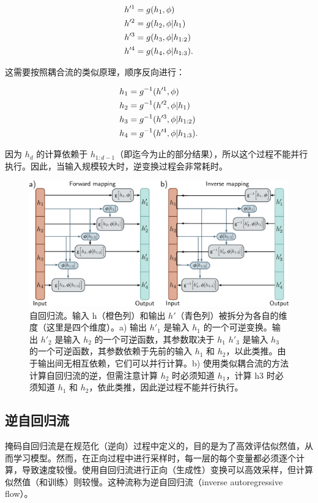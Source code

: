 \begin{align}
&h'^1 = g(h_1, \phi) \notag \\
&h'^2 = g(h_2, \phi|h_1) \notag \\
&h'^3 = g(h_3, \phi|h_{1:2}) \notag \\
&h'^4 = g(h_4, \phi|h_{1:3}) .  
\end{align}


这需要按照耦合流的类似原理，顺序反向进行：


\begin{align}
&h_1 = g^{-1}(h'^1, \phi) \notag \\
&h_2 = g^{-1}(h'^2, \phi|h_1) \notag \\
&h_3 = g^{-1}(h'^3, \phi|h_{1:2}) \notag \\
&h_4 = g^{-1}(h'^4, \phi|h_{1:3}) . 
\end{align} 


因为 \(h_d\) 的计算依赖于 \(h_{1:d-1}\)（即迄今为止的部分结果），所以这个过程不能并行执行。因此，当输入规模较大时，逆变换过程会非常耗时。

\begin{figure}[ht!]
\centering
\includegraphics[width=0.7\linewidth]{png/chapter16/FlowAutoregressive.png}
\caption{自回归流。输入 h（橙色列）和输出 \(h \prime\)（青色列）被拆分为各自的维度（这里是四个维度）。a) 输出 \(h \prime _1\) 是输入 \(h_1\) 的一个可逆变换。输出 \(h \prime_2\) 是输入 \(h_2\) 的一个可逆函数，其参数取决于 \(h_1\) \(h\prime_3\) 是输入 \(h_3\) 的一个可逆函数，其参数依赖于先前的输入 \(h_1\) 和 \(h_2\)，以此类推。由于输出间无相互依赖，它们可以并行计算。b) 使用类似耦合流的方法计算自回归流的逆，但需注意计算 \(h_2\) 时必须知道 \(h_1\)，计算 h3 时必须知道 \(h_1\) 和 \(h_2\)，依此类推，因此逆过程不能并行执行。}
\end{figure}



\subsection{逆自回归流}
掩码自回归流是在规范化（逆向）过程中定义的，目的是为了高效评估似然值，从而学习模型。然而，在正向过程中进行采样时，每一层的每个变量都必须逐个计算，导致速度较慢。使用自回归流进行正向（生成性）变换可以高效采样，但计算似然值（和训练）则较慢。这种流称为逆自回归流（inverse autoregressive flow）。

